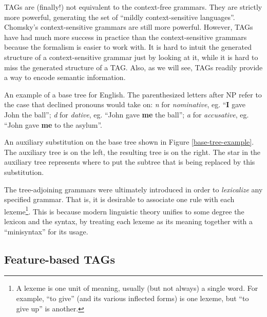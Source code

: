 \documentclass[12pt]{article}
\newcommand{\defn}[1]{\textit{#1}}
\begin{document}
TAGs are (finally!) not equivalent to the context-free grammars.  They
are strictly more powerful, generating the set of ``mildly
context-sensitive languages''.  Chomsky's context-sensitive grammars are
still more powerful.  However, TAGs have had much more success in
practice than the context-sensitive grammars because the formalism is
easier to work with.  It is hard to intuit the generated structure of a
context-sensitive grammar just by looking at it, while it is hard to
miss the generated structure of a TAG.  Also, as we will see, TAGs
readily provide a way to encode semantic information.

\begin{Figure}
\begin{center}
\end{center}
\caption{An example of a base tree for English.  The parenthesized
letters after NP refer to the case that declined pronouns would take on:
\textit{n} for \defn{nominative}, eg. ``\textbf{I} gave John the
ball''; \textit{d} for \defn{dative}, eg. ``John gave \textbf{me} the
ball''; \textit{a} for \defn{accusative}, eg.  ``John gave \textbf{me}
to the asylum''.}
\label{base-tree-example}
\end{Figure}

\begin{Figure}
\begin{center}
\end{center}
\caption{An auxiliary substitution on the base tree shown in Figure
\ref{base-tree-example}.  The auxiliary tree is on the left, the
resulting tree is on the right.  The star in the auxiliary tree
represents where to put the subtree that is being replaced by this
substitution.}
\label{adjoining-substitution}
\end{Figure}

The tree-adjoining grammars were ultimately introduced in order to
\defn{lexicalize} any specified grammar.  That is, it is desirable to
associate one rule with each lexeme\footnote{A lexeme is one unit of
meaning, usually (but not always) a single word.  For example, ``to
give'' (and its various inflected forms) is one lexeme, but ``to give
up'' is another.}.  This is because modern linguistic theory unifies to
some degree the lexicon and the syntax, by treating each lexeme as its
meaning together with a ``minisyntax'' for its usage.

\subsection{Feature-based TAGs}
\label{subsec-feature-tags}
\end{document}
